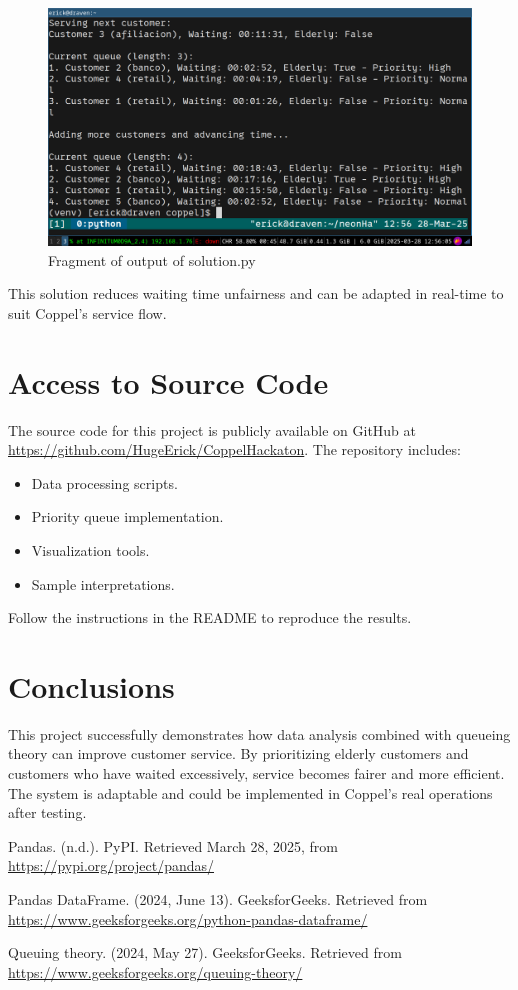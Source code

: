 \documentclass[twoside]{article}
\begin{document}
\begin{figure}[H]
  \centering
  \includegraphics[width=1\textwidth]{imgs/outpOfSol.png}
  \caption{Fragment of output of solution.py}
  \label{fig:3}
\end{figure}

This solution reduces waiting time unfairness and can be adapted in real-time to suit Coppel's service flow.

\section{Access to Source Code}
The source code for this project is publicly available on GitHub at \url{https://github.com/HugeErick/CoppelHackaton}. The repository includes:
\begin{itemize}
    \item Data processing scripts.
    \item Priority queue implementation.
    \item Visualization tools.
    \item Sample interpretations.
\end{itemize}
Follow the instructions in the README to reproduce the results.

\section{Conclusions}
This project successfully demonstrates how data analysis combined with queueing theory can improve customer service. By prioritizing elderly customers and customers who have waited excessively, service becomes fairer and more efficient. The system is adaptable and could be implemented in Coppel's real operations after testing.

\begin{thebibliography}{9}
  Pandas. (n.d.). PyPI. Retrieved March 28, 2025, from \url{https://pypi.org/project/pandas/}
  
  Pandas DataFrame. (2024, June 13). GeeksforGeeks. Retrieved from \url{https://www.geeksforgeeks.org/python-pandas-dataframe/}
  
  Queuing theory. (2024, May 27). GeeksforGeeks. Retrieved from \url{https://www.geeksforgeeks.org/queuing-theory/} 
\end{thebibliography}
\end{document}
